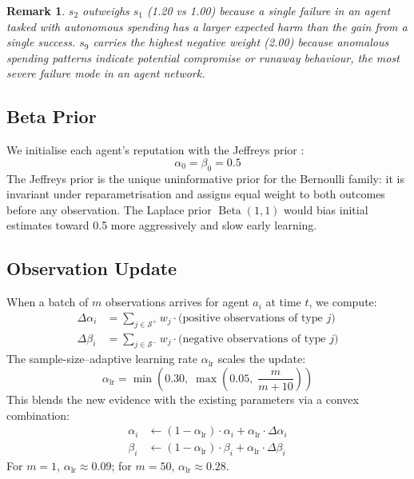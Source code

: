 \documentclass[conference]{IEEEtran}
\newtheorem{remark}{Remark}
\DeclareMathOperator{\Beta}{\mathrm{Beta}}
\begin{document}
\begin{remark}
$s_2$ outweighs $s_1$ (1.20 vs 1.00) because a single
failure in an agent tasked with autonomous spending has a
larger expected harm than the gain from a single success.
$s_9$ carries the highest negative weight (2.00) because
anomalous spending patterns indicate potential compromise or
runaway behaviour, the most severe failure mode in an
agent network.
\end{remark}

\subsection{Beta Prior}

We initialise each agent's reputation with the Jeffreys prior
\cite{josang2002beta}:
\begin{equation}
  \alpha_0 = \beta_0 = 0.5
  \label{eq:prior}
\end{equation}
The Jeffreys prior is the unique uninformative prior for the
Bernoulli family: it is invariant under reparametrisation
and assigns equal weight to both outcomes before any
observation. The Laplace prior $\Beta(1,1)$ would bias initial
estimates toward 0.5 more aggressively and slow early learning.

\subsection{Observation Update}

When a batch of $m$ observations arrives for agent $a_i$ at
time $t$, we compute:
\begin{align}
  \Delta\alpha_i &= \sum_{j \in \mathcal{S}^+} w_j \cdot
    \text{(positive observations of type } j \text{)}
    \label{eq:dalpha} \\
  \Delta\beta_i  &= \sum_{j \in \mathcal{S}^-} w_j \cdot
    \text{(negative observations of type } j \text{)}
    \label{eq:dbeta}
\end{align}
The sample-size–adaptive learning rate $\alpha_{\text{lr}}$
scales the update:
\begin{equation}
  \alpha_{\text{lr}} = \min\!\left(0.30,\;
    \max\!\left(0.05,\; \frac{m}{m + 10}\right)\right)
  \label{eq:lr}
\end{equation}
This blends the new evidence with the existing parameters via
a convex combination:
\begin{align}
  \alpha_i &\leftarrow (1 - \alpha_{\text{lr}}) \cdot \alpha_i
    + \alpha_{\text{lr}} \cdot \Delta\alpha_i
    \label{eq:alpha_update} \\
  \beta_i  &\leftarrow (1 - \alpha_{\text{lr}}) \cdot \beta_i
    + \alpha_{\text{lr}} \cdot \Delta\beta_i
    \label{eq:beta_update}
\end{align}
For $m=1$, $\alpha_{\text{lr}} \approx 0.09$; for $m = 50$,
$\alpha_{\text{lr}} \approx 0.28$.
\end{document}

